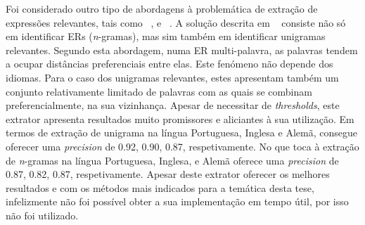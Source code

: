 Foi considerado outro tipo de abordagens à problemática de extração de expressões relevantes, tais como ~\cite{ventura2012mining}, e ~\cite{da1999local}. A solução descrita em ~\cite{ventura2012mining} consiste não só em identificar ERs (\textit{n}-gramas), mas sim também em identificar unigramas relevantes. Segundo esta abordagem, numa ER multi-palavra, as palavras tendem a ocupar distâncias preferenciais entre elas. Este fenómeno não depende dos idiomas. Para o caso dos unigramas relevantes, estes apresentam também um conjunto relativamente limitado de palavras com as quais se combinam preferencialmente, na sua vizinhança. Apesar de necessitar de \textit{thresholds}, este extrator apresenta resultados muito promissores e aliciantes à sua utilização. Em termos de extração de unigrama na língua Portuguesa, Inglesa e Alemã, consegue oferecer uma \textit{precision} de 0.92, 0.90, 0.87, respetivamente. No que toca à extração de \textit{n}-gramas na língua Portuguesa, Inglesa, e Alemã oferece uma \textit{precision} de 0.87, 0.82, 0.87, respetivamente. Apesar deste extrator oferecer os melhores resultados e com os métodos mais indicados para a temática desta tese, infelizmente não foi possível obter a sua implementação em tempo útil, por isso não foi utilizado.

